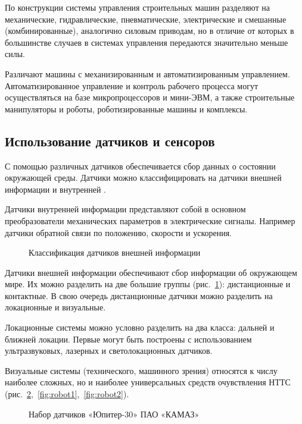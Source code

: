 По конструкции системы управления строительных машин разделяют на механические, гидравлические, пневматические, электрические и смешанные (комбинированные), аналогично силовым приводам, но в отличие от которых в большинстве случаев в системах управления передаются значительно меньше силы.

Различают машины с механизированным и автоматизированным управлением. Автоматизированное управление и контроль рабочего процесса могут осуществляться на базе микропроцессоров и мини-ЭВМ, а также строительные манипуляторы и роботы, роботизированные машины и комплексы.

\subsection{Использование датчиков и сенсоров}\label{subsec:ch1/sec2/sub2}

С помощью различных датчиков обеспечивается сбор данных о состоянии окружающей среды. Датчики можно классифицировать на датчики внешней информации и внутренней \cite[с.~131]{Vlasov}. 

Датчики внутренней информации представляют собой в основном преобразователи механических параметров в электрические сигналы. Например датчики обратной связи по положению, скорости и ускорения.

\begin{figure}[ht]
    \caption{Классификация датчиков внешней информации}\label{fig:datchiki}
\end{figure}

Датчики внешней информации обеспечивают сбор информации об окружающем мире. Их можно разделить на две большие группы (рис.~\cref{fig:datchiki}): дистанционные и контактные. В свою очередь дистанционные датчики можно разделить на локационные и визуальные.

Локационные системы можно условно разделить на два класса: дальней и ближней локации. Первые могут быть построены с использованием ультразвуковых, лазерных и светолокационных датчиков.

Визуальные системы (технического, машинного зрения) относятся к числу наиболее сложных, но и наиболее универсальных средств очувствления НТТС 
(рис.~\cref{fig:kamaz},~\cref{fig:robot1},~\cref{fig:robot2}).

\begin{figure}[ht]
    \caption{Набор датчиков «Юпитер-30» ПАО «КАМАЗ»}\label{fig:kamaz}
\end{figure}

